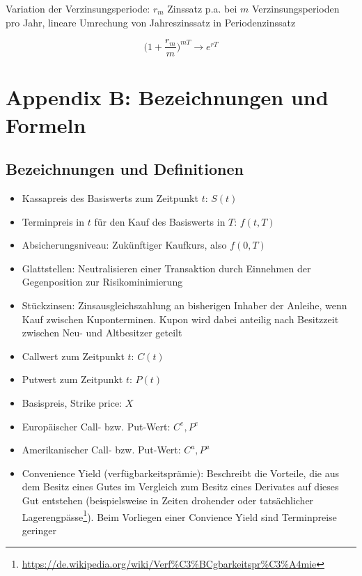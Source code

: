 Variation der Verzinsungsperiode: \(r_m\) Zinssatz p.a. bei \(m\) Verzinsungsperioden pro Jahr, lineare Umrechung von Jahreszinssatz in Periodenzinssatz

\[\Big(1+\frac{r_m}{m}\Big)^{mT} \longrightarrow e^{rT}\]


\section{Appendix B: Bezeichnungen und Formeln}

\subsection{Bezeichnungen und Definitionen}
\begin{itemize}
	\item Kassapreis des Basiswerts zum Zeitpunkt \(t\): \(S(t)\)
	\item Terminpreis in \(t\) für den Kauf des Basiswerts in \(T\): \(f(t,T)\)
	\item Absicherungsniveau: Zukünftiger Kaufkurs, also \(f(0,T)\)
	\item Glattstellen: Neutralisieren einer Transaktion durch Einnehmen der Gegenposition zur Risikominimierung
	\item Stückzinsen: Zinsausgleichszahlung an bisherigen Inhaber der Anleihe, wenn Kauf zwischen Kuponterminen. Kupon wird dabei anteilig nach Besitzzeit zwischen Neu- und Altbesitzer geteilt
	\item Callwert zum Zeitpunkt \(t\): \(C(t)\)
	\item Putwert zum Zeitpunkt \(t\): \(P(t)\)
	\item Basispreis, Strike price: \(X\)
	\item Europäischer Call- bzw. Put-Wert: \(C^e, P^e\)
	\item Amerikanischer Call- bzw. Put-Wert: \(C^a, P^a\)
	\item Convenience Yield (verfügbarkeitsprämie): Beschreibt die Vorteile, die aus dem Besitz eines Gutes im Vergleich zum Besitz eines Derivates auf dieses Gut entstehen (beispielsweise in Zeiten drohender oder tatsächlicher Lagerengpässe\footnote{\url{https://de.wikipedia.org/wiki/Verf\%C3\%BCgbarkeitspr\%C3\%A4mie}}). Beim Vorliegen einer Convience Yield sind Terminpreise geringer
\end{itemize}


